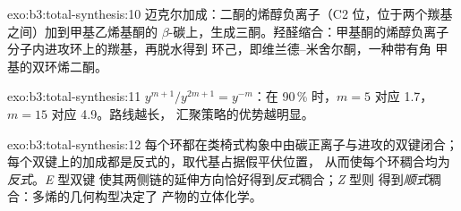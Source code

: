 \begin{solution}{exo:b3:total-synthesis:10}
迈克尔加成：二酮的烯醇负离子（C2 位，位于两个羰基之间）加到甲基乙烯基酮的
$\beta$-碳上，生成三酮。羟醛缩合：甲基酮的烯醇负离子
分子内进攻环上的羰基，再脱水得到
环己，即维兰德–米舍尔酮，一种带有角
甲基的双环烯二酮。
\end{solution}

\begin{solution}{exo:b3:total-synthesis:11}
$y^{m+1}/y^{2m+1} = y^{-m}$：在 90\,\% 时，$m = 5$ 对应 1.7，$m = 15$ 对应 4.9。路线越长，
汇聚策略的优势越明显。
\end{solution}

\begin{solution}{exo:b3:total-synthesis:12}
每个环都在类椅式构象中由碳正离子与进攻的双键闭合；
每个双键上的加成都是反式的，取代基占据假平伏位置，
从而使每个环稠合均为\textit{反式}。\textit{E} 型双键
使其两侧链的延伸方向恰好得到\textit{反式}稠合；\textit{Z} 型则
得到\textit{顺式}稠合：多烯的几何构型决定了
产物的立体化学。
\end{solution}

